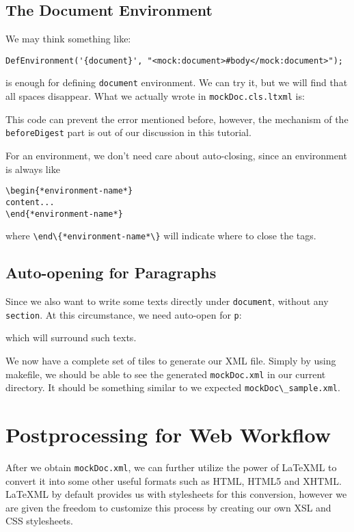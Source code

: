 \documentclass[a4paper]{article}
\def\latexml{{\LaTeX}ML\xspace}
\begin{document}
\subsection{The Document Environment}
We may think something like:
\begin{lstlisting}
DefEnvironment('{document}', "<mock:document>#body</mock:document>");
\end{lstlisting}
is enough for defining \lstinline|document| environment. We can try it, but we will find that all spaces disappear. What we actually wrote in \lstinline|mockDoc.cls.ltxml| is:
 
This code can prevent the error mentioned before, however, the mechanism of the \lstinline|beforeDigest| part is out of our discussion in this tutorial.

 For an environment, we don't need care about auto-closing, since an environment is always like
\begin{lstlisting}
\begin{*environment-name*}
content...
\end{*environment-name*}
\end{lstlisting}
where \lstinline|\end\{*environment-name*\}| will indicate where to close the tags.

\subsection{Auto-opening for Paragraphs}
Since we also want to write some texts directly under \lstinline|document|, without any \lstinline|section|. At this circumstance, we need auto-open for \lstinline|p|:
 
which will surround such texts.


We now have a complete set of tiles to generate our XML file. Simply by using makefile, we should be able to see the generated \lstinline|mockDoc.xml| in our current directory. It should be something similar to we expected
\lstinline|mockDoc\_sample.xml|.
  
\section{Postprocessing for Web Workflow}\label{sec:posp}
After we obtain \lstinline|mockDoc.xml|, we can further utilize the power of \latexml to convert it into some other
useful formats such as HTML, HTML5 and XHTML. \latexml by default provides us with stylesheets for this conversion, however we are given the freedom to customize this process by creating our own XSL and CSS stylesheets.
\end{document}
